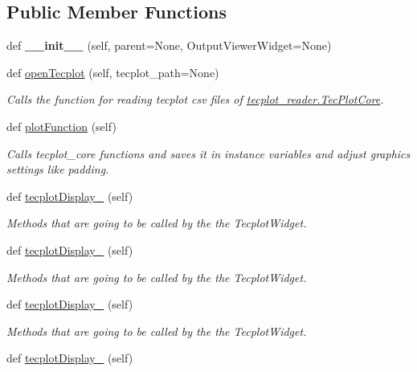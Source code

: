 \subsection*{Public Member Functions}
\begin{DoxyCompactItemize}
\item 
\hypertarget{a00111_abc270dcf6e8aaa3a645ae0258c4a9e5e}{}\label{a00111_abc270dcf6e8aaa3a645ae0258c4a9e5e} 
def {\bfseries \+\_\+\+\_\+init\+\_\+\+\_\+} (self, parent=None, Output\+Viewer\+Widget=None)
\item 
def \hyperlink{a00111_a6b4350a2c6ee537dba6bbe1549778636}{open\+Tecplot} (self, tecplot\+\_\+path=None)
\begin{DoxyCompactList}\small\item\em Calls the function for reading tecplot csv files of \hyperlink{a00119}{tecplot\+\_\+reader.\+Tec\+Plot\+Core}. \end{DoxyCompactList}\item 
def \hyperlink{a00111_a62c9724fbeda8d8780e57559bada3282}{plot\+Function} (self)
\begin{DoxyCompactList}\small\item\em Calls tecplot\+\_\+core functions and saves it in instance variables and adjust graphics settings like padding. \end{DoxyCompactList}\item 
def \hyperlink{a00111_ae792d997329b65cfed0b8a0a5feaa1a2}{tecplot\+Display\+\_} (self)
\begin{DoxyCompactList}\small\item\em Methods that are going to be called by the the Tecplot\+Widget. \end{DoxyCompactList}\item 
def \hyperlink{a00111_aec1f3f862b488e5f66161ca7241908c1}{tecplot\+Display\+\_} (self)
\begin{DoxyCompactList}\small\item\em Methods that are going to be called by the the Tecplot\+Widget. \end{DoxyCompactList}\item 
def \hyperlink{a00111_ae29c235476c3ca1ff19f4b933b86ed86}{tecplot\+Display\+\_} (self)
\begin{DoxyCompactList}\small\item\em Methods that are going to be called by the the Tecplot\+Widget. \end{DoxyCompactList}\item 
def \hyperlink{a00111_acdc9dc387494507084a2ab2cc0c8d9ac}{tecplot\+Display\+\_} (self)

\end{DoxyCompactItemize}
